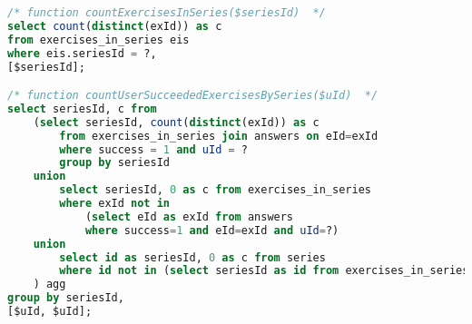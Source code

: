 \begin{lstlisting}[language=sql]
/* function countExercisesInSeries($seriesId)  */
select count(distinct(exId)) as c
from exercises_in_series eis
where eis.seriesId = ?,
[$seriesId];

/* function countUserSucceededExercisesBySeries($uId)  */
select seriesId, c from
    (select seriesId, count(distinct(exId)) as c
        from exercises_in_series join answers on eId=exId
        where success = 1 and uId = ?
        group by seriesId
    union
        select seriesId, 0 as c from exercises_in_series
        where exId not in
            (select eId as exId from answers
            where success=1 and eId=exId and uId=?)
    union
        select id as seriesId, 0 as c from series
        where id not in (select seriesId as id from exercises_in_series)
    ) agg
group by seriesId,
[$uId, $uId];

\end{lstlisting}
